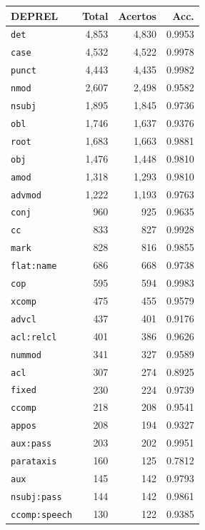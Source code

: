 \begin{table}[ht]
\centering
\footnotesize
\begin{tabular}{lrrr}
\toprule
\textbf{DEPREL} & \textbf{Total} & \textbf{Acertos} & \textbf{Acc.} \\
\midrule
\texttt{det} & 4,853 & 4,830 & 0.9953 \\
\texttt{case} & 4,532 & 4,522 & 0.9978 \\
\texttt{punct} & 4,443 & 4,435 & 0.9982 \\
\texttt{nmod} & 2,607 & 2,498 & 0.9582 \\
\texttt{nsubj} & 1,895 & 1,845 & 0.9736 \\
\texttt{obl} & 1,746 & 1,637 & 0.9376 \\
\texttt{root} & 1,683 & 1,663 & 0.9881 \\
\texttt{obj} & 1,476 & 1,448 & 0.9810 \\
\texttt{amod} & 1,318 & 1,293 & 0.9810 \\
\texttt{advmod} & 1,222 & 1,193 & 0.9763 \\
\texttt{conj} & 960 & 925 & 0.9635 \\
\texttt{cc} & 833 & 827 & 0.9928 \\
\texttt{mark} & 828 & 816 & 0.9855 \\
\texttt{flat\!:\!name} & 686 & 668 & 0.9738 \\
\texttt{cop} & 595 & 594 & 0.9983 \\
\texttt{xcomp} & 475 & 455 & 0.9579 \\
\texttt{advcl} & 437 & 401 & 0.9176 \\
\texttt{acl\!:\!relcl} & 401 & 386 & 0.9626 \\
\texttt{nummod} & 341 & 327 & 0.9589 \\
\texttt{acl} & 307 & 274 & 0.8925 \\
\texttt{fixed} & 230 & 224 & 0.9739 \\
\texttt{ccomp} & 218 & 208 & 0.9541 \\
\texttt{appos} & 208 & 194 & 0.9327 \\
\texttt{aux\!:\!pass} & 203 & 202 & 0.9951 \\
\texttt{parataxis} & 160 & 125 & 0.7812 \\
\texttt{aux} & 145 & 142 & 0.9793 \\
\texttt{nsubj\!:\!pass} & 144 & 142 & 0.9861 \\
\texttt{ccomp\!:\!speech} & 130 & 122 & 0.9385 \\

\end{tabular}
\end{table}

